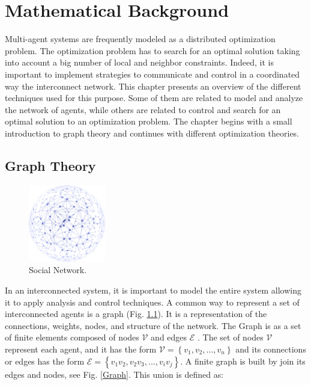 \chapter{Mathematical Background}

Multi-agent systems are frequently modeled as a distributed optimization problem. The optimization problem has to search for an optimal solution taking into account a big number of local and neighbor constraints. Indeed, it is important to implement strategies to communicate and control in a coordinated way the interconnect network. This chapter presents an overview of the different techniques used for this purpose. Some of them are related to model and analyze the network of agents, while others are related to control and search for an optimal solution to an optimization problem. The chapter begins with a small introduction to graph theory and continues with different optimization theories. 

\section{Graph Theory}


\begin{figure}[h]
\begin{center}
    \includegraphics[width=0.3\textwidth]{Kap2/Network.png}
    \caption{Social Network.}
    \label{Social_net}
\end{center}
\end{figure}

In an interconnected system, it is important to model the entire system allowing it to apply analysis and control techniques. A common way to represent a set of interconnected agents is a graph (Fig. \ref{Social_net}). It is a representation of the connections, weights, nodes, and structure of the network. The Graph is as a set of finite elements composed of nodes $\mathcal{V}$ and edges $\mathcal{E}$ . The set of  nodes $\mathcal{V}$ represent each agent, and it has the form $\mathcal{V} =  \left \{ v_{1},v_{2},...,v_{n} \right \}$ and its connections or edges has the form $\mathcal{E} =  \left \{ v_{1}v_{2},v_{2}v_{3},...,v_{i}v_{j} \right \}$. A finite graph is built by join its edges and nodes, see Fig. \ref{Graph}. This union is defined as: 


